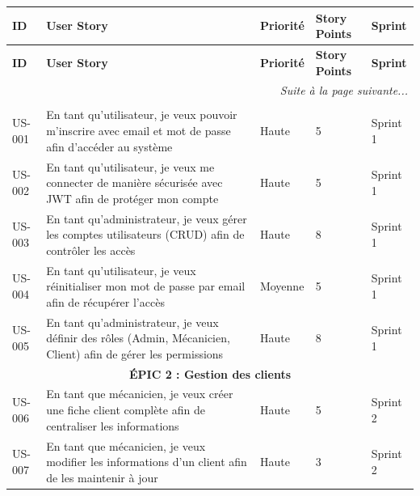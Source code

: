 \begin{longtable}{|p{1cm}|p{5.5cm}|p{1.8cm}|p{1.5cm}|p{1.5cm}|}
\hline
\rowcolor{gray!30}
\textbf{ID} & \textbf{User Story} & \textbf{Priorité} & \textbf{Story Points} & \textbf{Sprint} \\
\hline
\endfirsthead

\hline
\rowcolor{gray!30}
\textbf{ID} & \textbf{User Story} & \textbf{Priorité} & \textbf{Story Points} & \textbf{Sprint} \\
\hline
\endhead

\hline
\multicolumn{5}{|r|}{\textit{Suite à la page suivante...}} \\
\hline
\endfoot

\hline
\endlastfoot

\multicolumn{5}{|c|}{\cellcolor{gray!20}\textbf{ÉPIC 1 : Authentification et gestion des utilisateurs}} \\
\hline

US-001 & En tant qu'utilisateur, je veux pouvoir m'inscrire avec email et mot de passe afin d'accéder au système & Haute & 5 & Sprint 1 \\
\hline

US-002 & En tant qu'utilisateur, je veux me connecter de manière sécurisée avec JWT afin de protéger mon compte & Haute & 5 & Sprint 1 \\
\hline

US-003 & En tant qu'administrateur, je veux gérer les comptes utilisateurs (CRUD) afin de contrôler les accès & Haute & 8 & Sprint 1 \\
\hline

US-004 & En tant qu'utilisateur, je veux réinitialiser mon mot de passe par email afin de récupérer l'accès & Moyenne & 5 & Sprint 1 \\
\hline

US-005 & En tant qu'administrateur, je veux définir des rôles (Admin, Mécanicien, Client) afin de gérer les permissions & Haute & 8 & Sprint 1 \\
\hline

\multicolumn{5}{|c|}{\cellcolor{gray!20}\textbf{ÉPIC 2 : Gestion des clients}} \\
\hline

US-006 & En tant que mécanicien, je veux créer une fiche client complète afin de centraliser les informations & Haute & 5 & Sprint 2 \\
\hline

US-007 & En tant que mécanicien, je veux modifier les informations d'un client afin de les maintenir à jour & Haute & 3 & Sprint 2 \\
\hline


\end{longtable}
